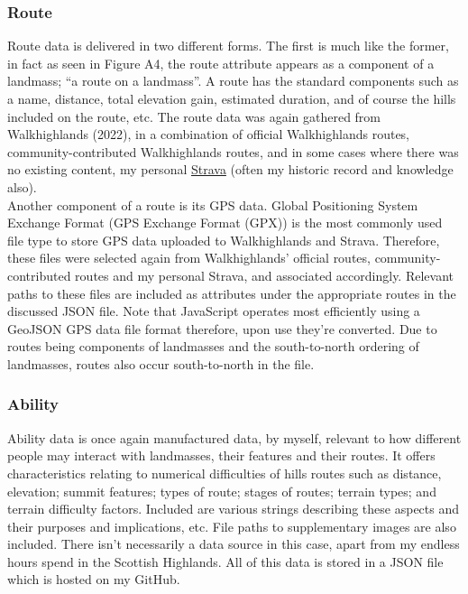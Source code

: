 \documentclass[11pt, english]{article}
\begin{document}
		\subsubsection{Route}

	Route data is delivered in two different forms. The first is much like the former, in fact as seen in Figure A4, the route attribute appears as a component of a landmass; ``a route on a landmass''. A route has the standard components such as a name, distance, total elevation gain, estimated duration, and of course the hills included on the route, etc. The route data was again gathered from Walkhighlands (2022), in a combination of official Walkhighlands routes, community-contributed Walkhighlands routes, and in some cases where there was no existing content, my personal \href{https://www.strava.com/athlete/training}{Strava} (often my historic record and knowledge also).\\

	Another component of a route is its GPS data. Global Positioning System Exchange Format (GPS Exchange Format (GPX)) is the most commonly used file type to store GPS data uploaded to Walkhighlands and Strava. Therefore, these files were selected again from Walkhighlands' official routes, community-contributed routes and my personal Strava, and associated accordingly. Relevant paths to these files are included as attributes under the appropriate routes in the discussed JSON file. Note that JavaScript operates most efficiently using a GeoJSON GPS data file format therefore, upon use they're converted. Due to routes being components of landmasses and the south-to-north ordering of landmasses, routes also occur south-to-north in the file.

		\subsubsection{Ability}

	Ability data is once again manufactured data, by myself, relevant to how different people may interact with landmasses, their features and their routes. It offers characteristics relating to numerical difficulties of hills routes such as distance, elevation; summit features; types of route; stages of routes; terrain types; and terrain difficulty factors. Included are various strings describing these aspects and their purposes and implications, etc. File paths to supplementary images are also included. There isn't necessarily a data source in this case, apart from my endless hours spend in the Scottish Highlands. All of this data is stored in a JSON file which is hosted on my GitHub.
\end{document}
